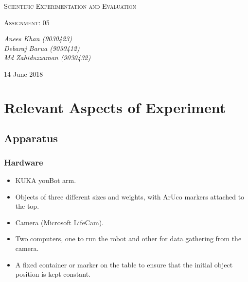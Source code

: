 \documentclass[10pt,a4paper]{article}
\begin{document}
				\begin{titlepage}
				\centering
			
					{\scshape\LARGE Scientific Experimentation and Evaluation\par}
			
					{\scshape\Large Assignment: 05\par}
			
					\vfill
			
					\vfill
					{\Large\itshape Anees Khan (9030423)
						\\Debaraj Barua (9030412)\\
						Md Zahiduzzaman (9030432)
						\par}
					\vfill
			
					{\large 14-June-2018\par}
				\end{titlepage}
				\tableofcontents
				\listoffigures	
				\listoftables
				\newpage
				\section{Relevant Aspects of Experiment}
				\subsection{Apparatus}
					\subsubsection{Hardware}
						\begin{itemize}
							\item KUKA youBot arm.
							\item Objects of three different sizes and weights, with ArUco markers attached to the top.
							\item Camera (Microsoft LifeCam).
							\item Two computers, one to run the robot and other for data gathering from the camera.
							\item A fixed container or marker on the table to ensure that the initial object position is kept constant.
						\end{itemize}
\end{document}
